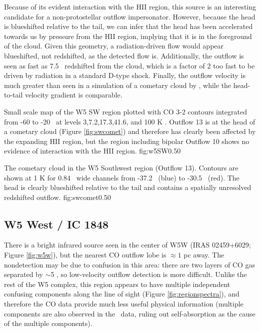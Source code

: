 Because of its evident interaction with the HII region, this source is an
interesting candidate for a non-protostellar outflow impersonator.  However,
because the head is blueshifted relative to the tail, we can infer that the
head has been accelerated towards us by pressure from the HII region, implying
that it is in the foreground of the cloud.  Given this geometry, a
radiation-driven flow would appear blueshifted, not redshifted, as the detected
flow is.  Additionally, the outflow is seen as fast as 7.5 \kms\ redshifted
from the cloud, which is a factor of 2 too fast to be driven by radiation in a
standard D-type shock.  Finally, the outflow velocity is much greater than seen
in a simulation of a cometary cloud by \citet{Gritschneder2010}, while the
head-to-tail velocity gradient is comparable.


{Small scale map of the W5 SW region plotted with CO 3-2 contours integrated
from -60 to -20 \kms\ at levels 3,7.2,17.3,41.6, and 100 K \kms. Outflow 13 is at the head of a 
cometary cloud (Figure \ref{fig:swcomet}) and therefore has clearly been
affected by the expanding HII region, but the region including bipolar Outflow
10 shows no evidence of interaction with the HII region. 
}{fig:w5SW}{0.5}{0}

{The cometary cloud in the W5 Southwest region (Outflow 13).  Contours are
shown at 1 K for 0.84 \kms\ wide channels from -37.2 \kms\ (blue) to -30.5
\kms\ (red).  The head is clearly blueshifted relative to the tail and contains
a spatially unresolved redshifted outflow.}
{fig:swcomet}{0.5}{0}


\subsection{W5 West / IC 1848}
\label{sec:i02459}
There is a bright infrared source seen in the center of W5W (IRAS 02459+6029;
Figure \ref{fig:w5w}), but the nearest CO outflow lobe is $\approx1$ pc away.
The nondetection may be due to confusion in this area: there are two layers of
CO gas separated by $\sim$5 \kms, so low-velocity outflow detection is more
difficult. %
Unlike the rest of the W5 complex, this region appears to have multiple
independent confusing components along the line of sight (Figure
\ref{fig:regionspectra}), and therefore the CO data provide much less
useful physical information (multiple components are also observed in the
\thirteenco\ data, ruling out self-absorption as the cause of the multiple
components).

